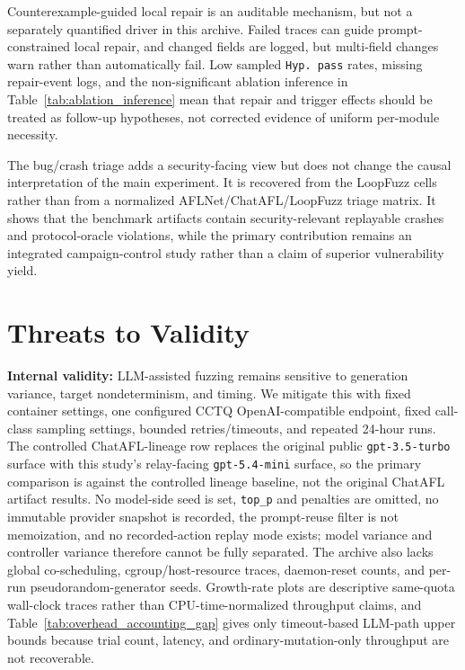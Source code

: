 \documentclass[final,5p,times,number]{elsarticle}
\begin{document}
Counterexample-guided local repair is an auditable mechanism, but not a separately quantified driver in this archive. Failed traces can guide prompt-constrained local repair, and changed fields are logged, but multi-field changes warn rather than automatically fail. Low sampled \texttt{Hyp. pass} rates, missing repair-event logs, and the non-significant ablation inference in Table~\ref{tab:ablation_inference} mean that repair and trigger effects should be treated as follow-up hypotheses, not corrected evidence of uniform per-module necessity.

The bug/crash triage adds a security-facing view but does not change the causal interpretation of the main experiment. It is recovered from the LoopFuzz cells rather than from a normalized AFLNet/ChatAFL/LoopFuzz triage matrix. It shows that the benchmark artifacts contain security-relevant replayable crashes and protocol-oracle violations, while the primary contribution remains an integrated campaign-control study rather than a claim of superior vulnerability yield.

\section{Threats to Validity}
\label{sec:threats}

\textbf{Internal validity:} LLM-assisted fuzzing remains sensitive to generation variance, target nondeterminism, and timing. We mitigate this with fixed container settings, one configured CCTQ OpenAI-compatible endpoint, fixed call-class sampling settings, bounded retries/timeouts, and repeated 24-hour runs. The controlled ChatAFL-lineage row replaces the original public \texttt{gpt-3.5-turbo} surface with this study's relay-facing \texttt{gpt-5.4-mini} surface, so the primary comparison is against the controlled lineage baseline, not the original ChatAFL artifact results. No model-side seed is set, \texttt{top\_p} and penalties are omitted, no immutable provider snapshot is recorded, the prompt-reuse filter is not memoization, and no recorded-action replay mode exists; model variance and controller variance therefore cannot be fully separated. The archive also lacks global co-scheduling, cgroup/host-resource traces, daemon-reset counts, and per-run pseudorandom-generator seeds. Growth-rate plots are descriptive same-quota wall-clock traces rather than CPU-time-normalized throughput claims, and Table~\ref{tab:overhead_accounting_gap} gives only timeout-based LLM-path upper bounds because trial count, latency, and ordinary-mutation-only throughput are not recoverable.
\end{document}
